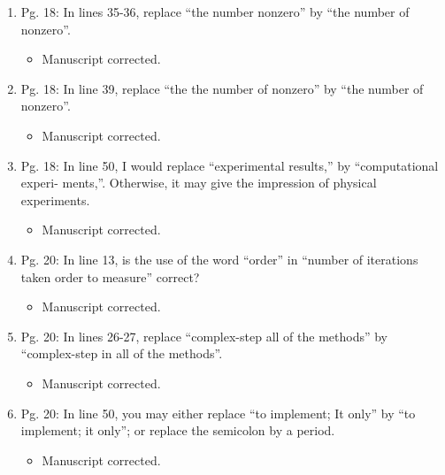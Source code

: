 \documentclass{article}
\begin{document}
\begin{enumerate}
 \item Pg. 18: In lines 35-36, replace “the number nonzero” by “the number of nonzero”.

{\color{red}  
\begin{itemize}
     \item
 Manuscript corrected. 
  \end{itemize}}

 \item Pg. 18: In line 39, replace “the the number of nonzero” by “the number of nonzero”.

{\color{red}  
\begin{itemize}
     \item
 Manuscript corrected. 
  \end{itemize}}

 \item Pg. 18: In line 50, I would replace “experimental results,” by “computational experi-
ments,”. Otherwise, it may give the impression of physical experiments.

{\color{red}  
\begin{itemize}
     \item
 Manuscript corrected. 
  \end{itemize}}

 \item Pg. 20: In line 13, is the use of the word “order” in “number of iterations taken order
to measure” correct?

{\color{red}  
\begin{itemize}
     \item
 Manuscript corrected.
  \end{itemize}}

 \item Pg. 20: In lines 26-27, replace “complex-step all of the methods” by “complex-step
in all of the methods”.

{\color{red}  
\begin{itemize}
     \item
 Manuscript corrected.
  \end{itemize}}

 \item Pg. 20: In line 50, you may either replace “to implement; It only” by “to implement;
it only”; or replace the semicolon by a period.

{\color{red}  
\begin{itemize}
     \item
 Manuscript corrected.
  \end{itemize}}


\end{enumerate}
\end{document}
